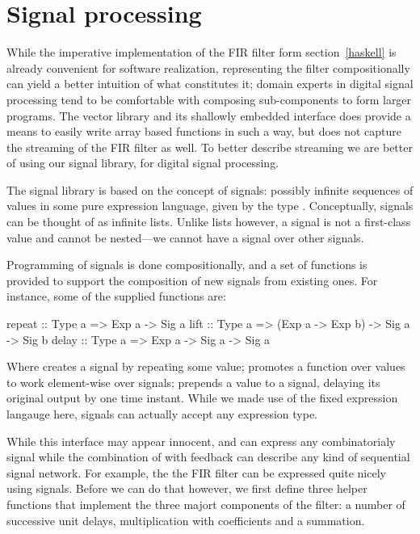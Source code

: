 \documentclass[../main.tex]{subfiles}
\begin{document}
\chapter{Signal processing}
\label{signals}

While the imperative implementation of the FIR filter form section~\ref{haskell} is already convenient for software realization, representing the filter compositionally can yield a better intuition of what constitutes it; domain experts in digital signal processing tend to be comfortable with composing sub-components to form larger programs. The vector library and its shallowly embedded interface does provide a means to easily write array based functions in such a way, but does not capture the streaming of the FIR filter as well. To better describe streaming we are better of using our signal library, for digital signal processing.

The signal library is based on the concept of signals: possibly infinite sequences of values in some pure expression language, given by the type . Conceptually, signals can be thought of as infinite lists. Unlike lists however, a signal is not a first-class value and cannot be nested---we cannot have a signal over other signals.

Programming of signals is done compositionally, and a set of functions is provided to support the composition of new signals from existing ones. For instance, some of the supplied functions are:

\begin{code}
repeat :: Type a => Exp a -> Sig a
lift   :: Type a => (Exp a -> Exp b) -> Sig a -> Sig b
delay  :: Type a => Exp a -> Sig a -> Sig a
\end{code}

\noindent Where  creates a signal by repeating some value;  promotes a function over values to work element-wise over signals;  prepends a value to a signal, delaying its original output by one time instant. While we made use of the fixed expression langauge  here, signals can actually accept any expression type.


While this interface may appear innocent,  and  can express any combinatorialy signal while the combination of  with feedback can describe any kind of sequential signal network. For example, the the FIR filter can be expressed quite nicely using signals. Before we can do that however, we first define three helper functions that implement the three majort components of the filter: a number of successive unit delays, multiplication with coefficients and a summation.
\end{document}
